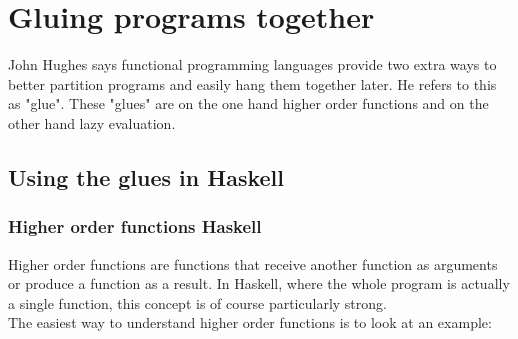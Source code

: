 \section{Gluing programs together}
John Hughes says functional programming languages provide two extra ways to
better partition programs and easily hang them together later. He refers to
this as "glue". These "glues" are on the one hand higher order functions and on
the other hand lazy evaluation. \cite{hughes_why_1989}

\subsection{Using the glues in Haskell} %
\label{sub:Using the glues in Haskel}
\subsubsection{Higher order functions Haskell} %
\label{sec:Higher order functions Haskell}
Higher order functions are functions that receive another function as arguments
or produce a function as a result. In Haskell, where the whole program is
actually a single function, this concept is of course particularly strong. \\
The easiest way to understand higher order functions is to look at an
example:\\

